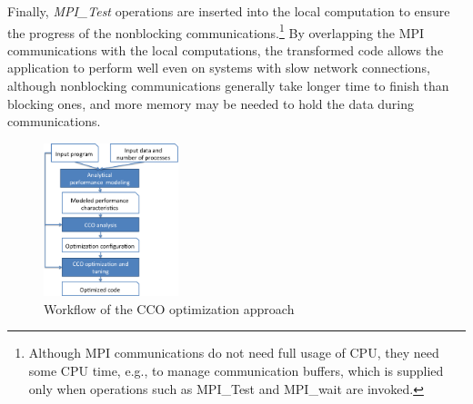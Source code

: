 Finally, \emph{MPI\_Test} operations are inserted into the local computation to
ensure the progress of the nonblocking
communications.\footnote{Although MPI communications do not need full
  usage of CPU, they need some CPU time, e.g., to manage communication
  buffers, which is supplied only when operations such as MPI\_Test
  and MPI\_wait are invoked.}  By overlapping the MPI communications
with the local computations, the transformed code allows the
application to perform well even on systems with slow network
connections, although nonblocking communications generally take longer
time to finish than blocking ones, and more memory may be needed to
hold the data during communications.

\begin{figure}[h]
\centering
\includegraphics[width=0.35\textwidth]{fig/framework.png} %
\caption{Workflow of the CCO optimization approach}
\label{fig:overview}
\end{figure}

